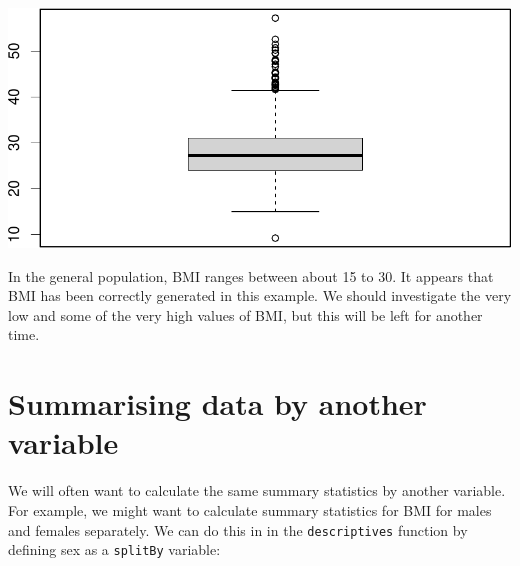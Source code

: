 \documentclass[
]{memoir}
\newenvironment{Shaded}{\begin{snugshade}}{\end{snugshade}}
\newcommand{\FunctionTok}[1]{\textcolor[rgb]{0.00,0.00,0.00}{#1}}
\newcommand{\NormalTok}[1]{#1}
\newcommand{\SpecialCharTok}[1]{\textcolor[rgb]{0.00,0.00,0.00}{#1}}
\begin{document}
\begin{Shaded}
\end{Shaded}

\includegraphics{02.1-Probability_files/figure-latex/unnamed-chunk-13-2.pdf}

In the general population, BMI ranges between about 15 to 30. It appears that BMI has been correctly generated in this example. We should investigate the very low and some of the very high values of BMI, but this will be left for another time.

\hypertarget{summarising-data-by-another-variable}{%
\section{Summarising data by another variable}\label{summarising-data-by-another-variable}}

We will often want to calculate the same summary statistics by another variable. For example, we might want to calculate summary statistics for BMI for males and females separately. We can do this in in the \texttt{descriptives} function by defining sex as a \texttt{splitBy} variable:
\end{document}
